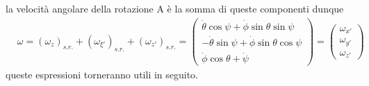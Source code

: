 \documentclass[
10pt, %
a4paper, %
oneside, %
headinclude,footinclude, %
BCOR5mm, %
]{scrartcl}
\begin{document}
la velocità angolare della rotazione A è la somma di queste componenti dunque
\begin{align*}
&\omega = (\omega_{z})_{s.r.}+(\omega_{\xi'})_{s.r.}+ (\omega_{z'})_{s.r.} = 
\begin{pmatrix}
	\dot{\theta}\cos\psi+\dot{\phi}\sin\theta\sin\psi\\
	-\dot{\theta}\sin\psi+\dot{\phi}\sin\theta\cos\psi\\
	\dot{\phi}\cos\theta+\dot{\psi}
\end{pmatrix}=
\begin{pmatrix}
\omega_{x'}\\
\omega_{y'}\\
\omega_{z'}
\end{pmatrix}
\end{align*}
queste espressioni torneranno utili in seguito.
\end{document}
